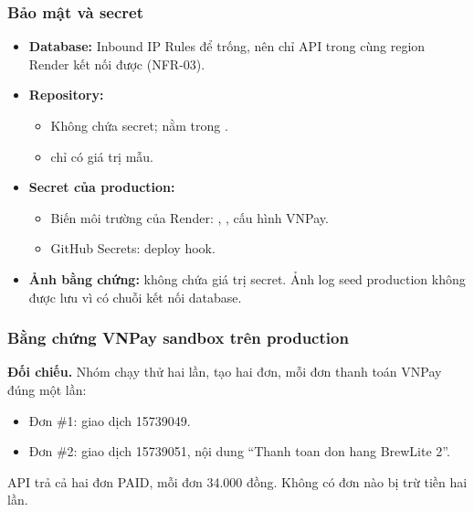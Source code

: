 \subsubsection{Bảo mật và secret}
\begin{itemize}
\item \textbf{Database:} Inbound IP Rules để trống, nên chỉ API trong cùng region Render kết nối được (NFR-03).
\item \textbf{Repository:}
  \begin{itemize}
  \item Không chứa secret;  nằm trong .
  \item {} chỉ có giá trị mẫu.
  \end{itemize}
\item \textbf{Secret của production:}
  \begin{itemize}
  \item Biến môi trường của Render: , , cấu hình VNPay.
  \item GitHub Secrets: deploy hook.
  \end{itemize}
\item \textbf{Ảnh bằng chứng:} không chứa giá trị secret. Ảnh log seed production không được lưu vì có chuỗi kết nối database.
\end{itemize}




\subsubsection{Bằng chứng VNPay sandbox trên production}

\textbf{Đối chiếu.} Nhóm chạy thử hai lần, tạo hai đơn, mỗi đơn thanh toán VNPay đúng một lần:
\begin{itemize}
\item Đơn \#1: giao dịch 15739049.
\item Đơn \#2: giao dịch 15739051, nội dung ``Thanh toan don hang BrewLite 2''.
\end{itemize}
API  trả cả hai đơn PAID, mỗi đơn 34.000 đồng. Không có đơn nào bị trừ tiền hai lần.

